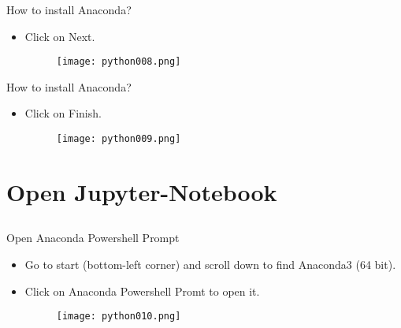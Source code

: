 \begin{frame}{How to install Anaconda?}
\begin{itemize}
\item Click on {\color{red}Next}.
\begin{figure}
\texttt{[image: python008.png]}
\end{figure}
\end{itemize}
\end{frame}

\begin{frame}{How to install Anaconda?}
\begin{itemize}
\item Click on {\color{red}Finish}.
\begin{figure}
\texttt{[image: python009.png]}
\end{figure}
\end{itemize}
\end{frame}

\section{Open Jupyter-Notebook}
\subsection{}

\begin{frame}{Open Anaconda Powershell Prompt}
\begin{itemize}
\item Go to start (bottom-left corner) and scroll down to find {\color{red}Anaconda3 (64 bit)}.
\item Click on {\color{red}Anaconda Powershell Promt} to open it.
\begin{figure}
\texttt{[image: python010.png]}
\end{figure}
\end{itemize}
\end{frame}

%
%

